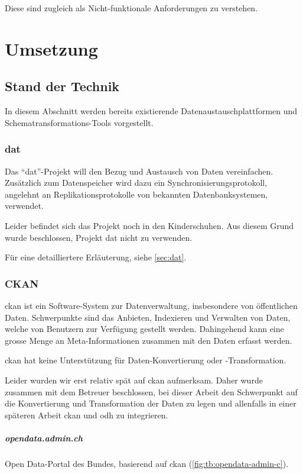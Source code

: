 Diese sind zugleich als Nicht-funktionale Anforderungen zu verstehen.

\chapter{Umsetzung}

\section{Stand der Technik} \label{sec:tb:state-of-the-art}

In diesem Abschnitt werden bereits existierende Datenaustauschplattformen und Schematransformations-Tools vorgestellt.

\subsection{dat}
Das ``dat''-Projekt will den Bezug und Austausch von Daten vereinfachen. Zusätzlich zum Datenspeicher wird dazu ein Synchronisierungsprotokoll, angelehnt an Replikationsprotokolle von bekannten Datenbanksystemen, verwendet.

Leider befindet sich das Projekt noch in den Kinderschuhen. Aus diesem Grund wurde beschlossen, Projekt dat nicht zu verwenden.

Für eine detailliertere Erläuterung, siehe \cref{sec:dat}.

\subsection{CKAN}
\gls{ckan} ist ein Software-System zur Datenverwaltung, insbesondere von öffentlichen Daten. Schwerpunkte sind das Anbieten, Indexieren und Verwalten von Daten, welche von Benutzern zur Verfügung gestellt werden. Dahingehend kann eine grosse Menge an Meta-Informationen zusammen mit den Daten erfasst werden. 

\gls{ckan} hat keine Unterstützung für Daten-Konvertierung oder -Transformation.

Leider wurden wir erst relativ spät auf \gls{ckan} aufmerksam. Daher wurde zusammen mit dem Betreuer beschlossen, bei dieser Arbeit den Schwerpunkt auf die Konvertierung und Transformation der Daten zu legen und allenfalls in einer späteren Arbeit \gls{ckan} und \acl{odh} zu integrieren.

\paragraph{opendata.admin.ch}
Open Data-Portal des Bundes, basierend auf \gls{ckan} (\cref{fig:tb:opendata-admin-c}).

